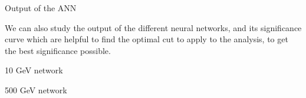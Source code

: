 \documentclass[handout,8 pt]{beamer}
\begin{document}
\begin{frame}{Output of the ANN}

\justifying
We can also study the output of the different neural networks, and its significance curve which are helpful to find the optimal cut to apply to the analysis, to get the best significance possible. \vfill

   \begin{minipage}[c]{.48\linewidth}
       \begin{exampleblock}{} { \begin{center} 10 GeV network \end{center}} \end{exampleblock} \vspace{2pt}
   \end{minipage} \hfill
   \hspace{4pt}
   \begin{minipage}[c]{.48\linewidth}
   	\begin{exampleblock}{} {\begin{center} 500 GeV network \end{center}} \end{exampleblock} \vspace{2pt}
\end{minipage}
\end{frame}
\end{document}
